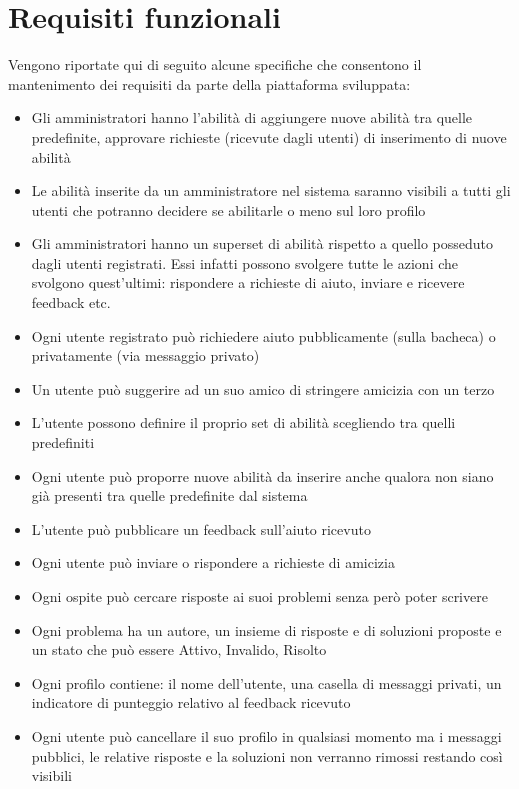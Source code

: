 \documentclass[a4paper,12pt]{article}
\begin{document}
\clearpage

\section{Requisiti funzionali}
Vengono riportate qui di seguito alcune specifiche che consentono il mantenimento dei requisiti da parte della piattaforma sviluppata:
\begin{itemize}
\item Gli amministratori hanno l’abilità di aggiungere nuove abilità tra quelle predefinite, approvare richieste (ricevute dagli utenti) di inserimento di nuove abilità
\item Le abilità inserite da un amministratore nel sistema saranno visibili a tutti gli utenti che potranno decidere se abilitarle o meno sul loro profilo
\item Gli amministratori hanno un superset di abilità rispetto a quello posseduto dagli utenti registrati. Essi infatti possono svolgere tutte le azioni che svolgono quest’ultimi: rispondere a richieste di aiuto, inviare e ricevere feedback etc.
\item Ogni utente registrato può richiedere aiuto pubblicamente (sulla bacheca) o privatamente (via messaggio privato)
\item Un utente può suggerire ad un suo amico di stringere amicizia con un terzo 
\item L’utente possono definire il proprio set di abilità scegliendo tra quelli predefiniti
\item Ogni utente può proporre nuove abilità da inserire anche qualora non siano già presenti tra quelle predefinite dal sistema
\item L’utente può pubblicare un feedback sull’aiuto ricevuto
\item Ogni utente può inviare o rispondere a richieste di amicizia
\item Ogni ospite può cercare risposte ai suoi problemi senza però poter scrivere
\item Ogni problema ha un autore, un insieme di risposte e di soluzioni proposte e un stato che può essere Attivo, Invalido, Risolto
\item Ogni profilo contiene: il nome dell’utente, una casella di messaggi privati, un indicatore di punteggio relativo al feedback ricevuto
\item Ogni utente può cancellare il suo profilo in qualsiasi momento ma i messaggi pubblici, le relative risposte e la soluzioni non verranno rimossi restando così visibili
\end{itemize}
\end{document}

